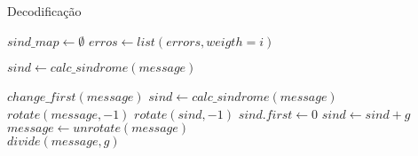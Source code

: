 \begin{algorithm}
	\caption{Decodificação}\label{alg:update_sindromes}
	\begin{algorithmic}[Message]
		\State $sind\_map \gets \emptyset$
			\State $erros \gets list(errors, weigth=i)$
			
		\EndFor
		
		\State $sind \gets calc\_sindrome(message)$
		
		\State $change\_first(message)$
		\State $sind \gets calc\_sindrome(message)$
		\Else
		\State $rotate(message, -1)$
		\State $rotate(sind, -1)$
		\State $sind.first \gets 0$
		\State $sind \gets sind+g$
		\EndIf
		\EndIf
		\EndWhile
		\State $message \gets unrotate(message)$\\
		\Return $divide(message, g)$
		\EndProcedure
	\end{algorithmic}
\end{algorithm}
 